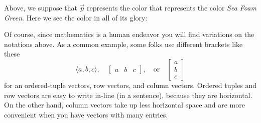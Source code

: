 \documentclass{ximera}
\begin{document}
\begin{concept}
\begin{description}
  Above, we suppose that $\vec{p}$ represents the color that
  represents the color \textit{Sea Foam Green}. Here we see the color in all of its glory:
  \begin{center}
    \colorbox[RGB]{159, 226, 191}{
      \parbox{1cm}{\rule{0pt}{1cm}}}
  \end{center}
\end{description}
\end{concept}

Of course, since mathematics is a human endeavor you will find
variations on the notations above. As a common example, some folks use
different brackets like these
\[
\langle a, b, c\rangle, \quad \begin{bmatrix} a & b & c \end{bmatrix}, \quad \text{or}\quad
\begin{bmatrix}
  a\\
  b\\
  c
\end{bmatrix}
\]
for an ordered-tuple vectors, row vectors, and column vectors. Ordered
tuples and row vectors are easy to write in-line (in a sentence),
because they are horizontal. On the other hand, column vectors take up
less horizontal space and are more convenient when you have vectors
with many entries.
\end{document}
